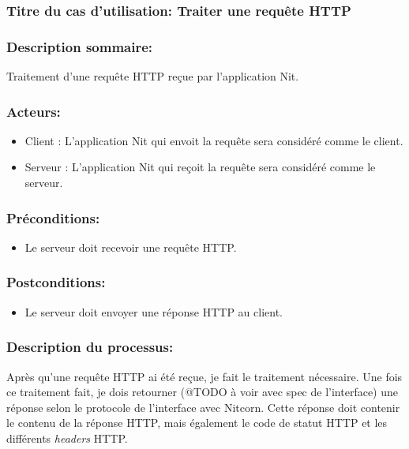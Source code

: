 \documentclass{scrreprt}
\begin{document}
\subsubsection{Titre du cas d'utilisation: Traiter une requête HTTP}

\subsubsection{Description sommaire:}
Traitement d'une requête HTTP reçue par l'application Nit.

\subsubsection{Acteurs:}
\begin{itemize}
    \item Client : L'application Nit qui envoit la requête sera considéré comme le client.
    \item Serveur : L'application Nit qui reçoit la requête sera considéré comme le serveur.
\end{itemize}

\subsubsection{Préconditions:}
\begin{itemize}
    \item Le serveur doit recevoir une requête HTTP. 
\end{itemize} 

\subsubsection{Postconditions:}
\begin{itemize}
    \item Le serveur doit envoyer une réponse HTTP au client. 
\end{itemize}
 
\subsubsection{Description du processus:}
Après qu'une requête HTTP ai été reçue, je fait le traitement nécessaire.
Une fois ce traitement fait, je dois retourner (@TODO à voir avec spec de l'interface)
une réponse selon le protocole de l'interface avec Nitcorn. Cette réponse doit
contenir le contenu de la réponse HTTP, mais également le code de statut HTTP
et les différents \textit{headers} HTTP.
\end{document}
